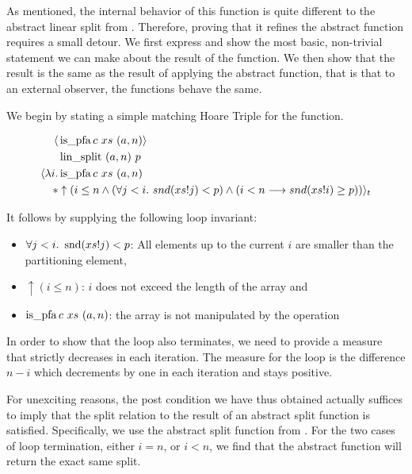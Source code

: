 As mentioned, the internal behavior of this function is
quite different to the abstract linear split from .
Therefore, proving that it refines the abstract function requires a small detour.
We first express and show the most basic, non-trivial statement
we can make about the result of the function.
We then show that the result is the same as the result
of applying the abstract function,
that is that to an external observer, the functions behave the same.

We begin by stating a simple matching Hoare Triple
for the function.

\begin{lemma}
    \label{lem:lin-split-ht}
    \begin{align*}
        \langle &\operatorname{is\_pfa} c\ xs\ (a,n)\rangle \\
                  &\operatorname{lin\_split}\ (a,n)\ p \\
        \langle \lambda i. & \operatorname{is\_pfa} c\ xs\ (a,n) \\
        * &\uparrow(i \leq n 
            \wedge (\forall j < i.\ snd (xs!j) < p) 
            \wedge (i<n \longrightarrow snd (xs!i) \geq p)) \rangle_t 
    \end{align*}
\end{lemma}

It follows by supplying the following loop invariant:

\begin{itemize}
    \item $\forall j<i.\ \operatorname{snd} (xs!j) < p$: All elements up to the current $i$
        are smaller than the partitioning element,
    \item $\uparrow(i \leq n)$: $i$ does not exceed the length of the array and
    \item $\operatorname{is\_pfa} c\ xs\ (a,n)$: the array is not manipulated by the operation
\end{itemize}

In order to show that the loop also terminates,
we need to provide a measure that strictly decreases in each iteration.
The measure for the loop is the difference $n-i$ which
decrements by one in each iteration and stays positive.

For unexciting reasons, the post condition we have thus obtained
actually suffices to imply that the split relation
to the result of an abstract split function is satisfied.
Specifically, we use the abstract split function from
. %
For the two cases of loop termination,
either $i = n$, or $i < n$, we find that
the abstract function will return the exact same split.

